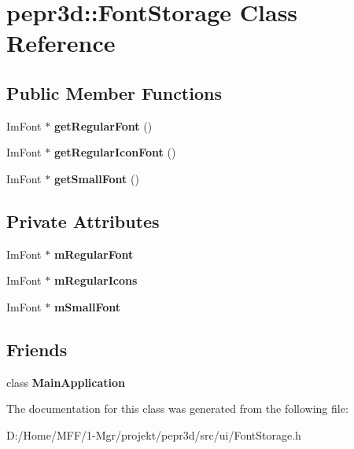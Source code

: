 \hypertarget{classpepr3d_1_1_font_storage}{}\section{pepr3d\+::Font\+Storage Class Reference}
\label{classpepr3d_1_1_font_storage}
\subsection*{Public Member Functions}
\begin{DoxyCompactItemize}
\item 
\mbox{\label{classpepr3d_1_1_font_storage_ae5d2bf9987181c0de0935b0fde4eeffc}} 
Im\+Font $\ast$ {\bfseries get\+Regular\+Font} ()
\item 
\mbox{\label{classpepr3d_1_1_font_storage_a6202a64a861a25046ec06224f1b20582}} 
Im\+Font $\ast$ {\bfseries get\+Regular\+Icon\+Font} ()
\item 
\mbox{\label{classpepr3d_1_1_font_storage_a4c5ce83b8b237fe4ebf7d8d359d5e522}} 
Im\+Font $\ast$ {\bfseries get\+Small\+Font} ()
\end{DoxyCompactItemize}
\subsection*{Private Attributes}
\begin{DoxyCompactItemize}
\item 
\mbox{\label{classpepr3d_1_1_font_storage_a3f57a61767609567b65f13b0deb5fc32}} 
Im\+Font $\ast$ {\bfseries m\+Regular\+Font}
\item 
\mbox{\label{classpepr3d_1_1_font_storage_a048b9a5918c273a439c551922a324dad}} 
Im\+Font $\ast$ {\bfseries m\+Regular\+Icons}
\item 
\mbox{\label{classpepr3d_1_1_font_storage_a6d097561af42377ed7f1434c8b39e6e1}} 
Im\+Font $\ast$ {\bfseries m\+Small\+Font}
\end{DoxyCompactItemize}
\subsection*{Friends}
\begin{DoxyCompactItemize}
\item 
\mbox{\label{classpepr3d_1_1_font_storage_a2a5e494cf46105f3943727a5bcaa1133}} 
class {\bfseries Main\+Application}
\end{DoxyCompactItemize}


The documentation for this class was generated from the following file\+:\begin{DoxyCompactItemize}
\item 
D\+:/\+Home/\+M\+F\+F/1-\/\+Mgr/projekt/pepr3d/src/ui/Font\+Storage.\+h\end{DoxyCompactItemize}
